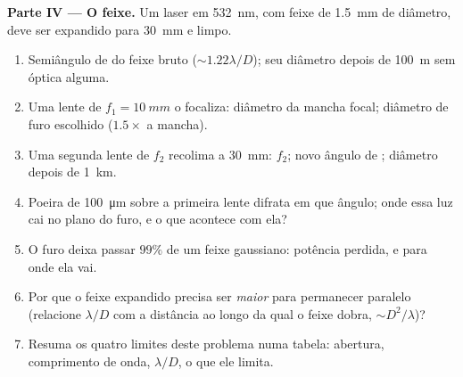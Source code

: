 \begin{problem}
\medskip
\noindent\textbf{Parte IV --- O feixe.}
Um laser em \qty{532}{nm}, com feixe de \qty{1.5}{mm} de diâmetro, deve ser expandido para
\qty{30}{mm} e limpo.
\begin{enumerate}[resume]
  \item Semiângulo de  do feixe bruto ($\sim1.22\lambda/D$); seu
        diâmetro depois de \qty{100}{m} sem óptica alguma.
  \item Uma lente de $f_1 = \qty{10}{mm}$ o focaliza: diâmetro da mancha focal;
        diâmetro de furo escolhido ($1.5\times$ a mancha).
  \item Uma segunda lente de $f_2$ recolima a \qty{30}{mm}: $f_2$; novo
        ângulo de ; diâmetro depois de \qty{1}{km}.
  \item Poeira de \qty{100}{\micro m} sobre a primeira lente difrata em que ângulo;
        onde essa luz cai no plano do furo, e o que
        acontece com ela?
  \item O furo deixa passar $99\%$ de um feixe gaussiano: potência perdida, e
        para onde ela vai.
  \item Por que o feixe expandido precisa ser \emph{maior} para permanecer paralelo
        (relacione $\lambda/D$ com a distância ao longo da qual o feixe dobra,
        $\sim D^2/\lambda$)?
  \item Resuma os quatro limites deste problema numa tabela: abertura,
        comprimento de onda, $\lambda/D$, o que ele limita.
\end{enumerate}
\end{problem}
